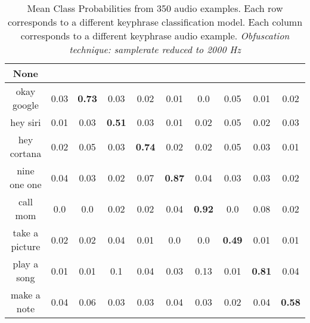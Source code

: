 \begin{table}[!th]
\begin{tabular}{cccccccccc}%
\hline%
None&\rotate{random talk}{70}&\rotate{okay google}{70}&\rotate{hey siri}{70}&\rotate{hey cortana}{70}&\rotate{nine one one}{70}&\rotate{call mom}{70}&\rotate{take a picture}{70}&\rotate{play a song}{70}&\rotate{make a note}{70}\\%
\hline%
okay google&0.03&\textbf{0.73}&0.03&0.02&0.01&0.0&0.05&0.01&0.02\\%
hey siri&0.01&0.03&\textbf{0.51}&0.03&0.01&0.02&0.05&0.02&0.03\\%
hey cortana&0.02&0.05&0.03&\textbf{0.74}&0.02&0.02&0.05&0.03&0.01\\%
nine one one&0.04&0.03&0.02&0.07&\textbf{0.87}&0.04&0.03&0.03&0.02\\%
call mom&0.0&0.0&0.02&0.02&0.04&\textbf{0.92}&0.0&0.08&0.02\\%
take a picture&0.02&0.02&0.04&0.01&0.0&0.0&\textbf{0.49}&0.01&0.01\\%
play a song&0.01&0.01&0.1&0.04&0.03&0.13&0.01&\textbf{0.81}&0.04\\%
make a note&0.04&0.06&0.03&0.03&0.04&0.03&0.02&0.04&\textbf{0.58}\\%
\hline%
\end{tabular}
\caption{Mean Class Probabilities from 350 audio examples. Each row corresponds to a different keyphrase classification model. Each column corresponds to a different keyphrase audio example. \emph{Obfuscation technique: samplerate reduced to 2000 Hz}}
\label{tab:probs_samplerate_2000}
\end{table}







